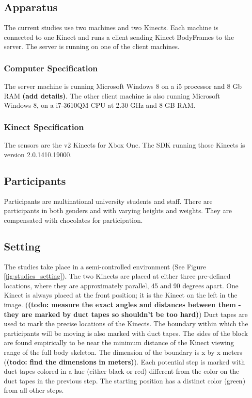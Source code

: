 \documentclass{sigchi}
\begin{document}
\subsection{Apparatus}

The current studies use two machines and two Kinects. Each machine is connected to one Kinect and runs a client sending Kinect BodyFrames to the server. The server is running on one of the client machines.

\subsubsection{Computer Specification}

The server machine is running Microsoft Windows 8 on a i5 processor and 8 Gb RAM \textbf{(add details)}. The other client machine is also running Microsoft Windows 8, on a i7-3610QM CPU at 2.30 GHz and 8 GB RAM.

\subsubsection{Kinect Specification}

The sensors are the v2 Kinects for Xbox One. The SDK running those Kinects is version 2.0.1410.19000.

\subsection{Participants}

Participants are multinational university students and staff. There are participants in both genders and with varying heights and weights. They are compensated with chocolates for participation.

\subsection{Setting}

The studies take place in a semi-controlled environment (See Figure \ref{fig:studies_setting}). The two Kinects are placed at either three pre-defined locations, where they are approximately parallel, 45 and 90 degrees apart. One Kinect is always placed at the front position; it is the Kinect on the left in the image. (\textbf{(todo: measure the exact angles and distances between them - they are marked by duct tapes so shouldn't be too hard)}) Duct tapes are used to mark the precise locations of the Kinects. The boundary within which the participants will be moving is also marked with duct tapes. The sides of the block are found empirically to be near the minimum distance of the Kinect viewing range of the full body skeleton. The dimension of the boundary is x by x meters (\textbf{(todo: find the dimensions in meters)}). Each potential step is marked with duct tapes colored in a hue (either black or red) different from the color on the duct tapes in the previous step. The starting position has a distinct color (green) from all other steps.
\end{document}
